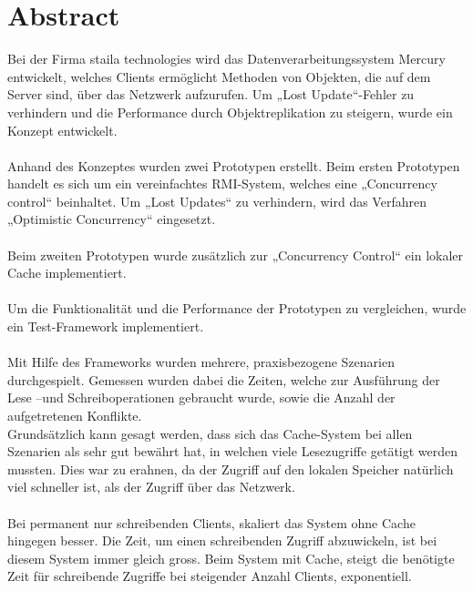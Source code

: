 \chapter*{Abstract}
Bei der Firma staila technologies wird das Datenverarbeitungssystem Mercury entwickelt, welches Clients ermöglicht Methoden von Objekten, die auf dem Server sind, über das Netzwerk aufzurufen. Um „Lost Update“-Fehler zu verhindern und die Performance durch Objektreplikation zu steigern, wurde ein Konzept entwickelt.\\ \\
Anhand des Konzeptes wurden zwei Prototypen erstellt. Beim ersten Prototypen handelt es sich um ein vereinfachtes RMI-System, welches eine „Concurrency control“ beinhaltet. Um „Lost Updates“ zu verhindern, wird das Verfahren „Optimistic Concurrency“ eingesetzt. \\ \\
Beim zweiten Prototypen wurde zusätzlich zur „Concurrency Control“ ein lokaler Cache implementiert.\\ \\
Um die Funktionalität und die Performance der Prototypen zu vergleichen, wurde ein Test-Framework implementiert.\\ \\
Mit Hilfe des Frameworks wurden mehrere, praxisbezogene Szenarien durchgespielt. Gemessen wurden dabei die Zeiten, welche zur Ausführung der Lese –und Schreiboperationen gebraucht wurde, sowie die Anzahl der aufgetretenen Konflikte.\\
Grundsätzlich kann gesagt werden, dass sich das Cache-System bei allen Szenarien als sehr gut bewährt hat, in welchen viele Lesezugriffe getätigt werden mussten. Dies war zu erahnen, da der Zugriff auf den lokalen Speicher natürlich viel schneller ist, als der Zugriff über das Netzwerk.\\ \\
Bei permanent nur schreibenden Clients, skaliert das System ohne Cache hingegen besser. Die Zeit, um einen schreibenden Zugriff abzuwickeln, ist bei diesem System immer gleich gross. Beim System mit Cache, steigt die benötigte Zeit für schreibende Zugriffe bei steigender Anzahl Clients, exponentiell.
